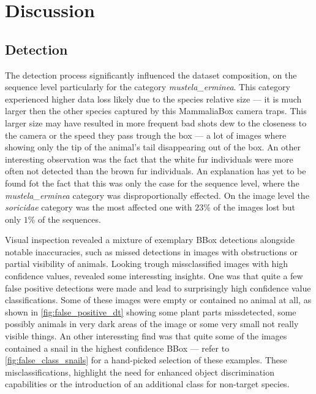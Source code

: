 


\section{Discussion}
\label{discussion}

\subsection{Detection}

The detection process significantly influenced the dataset composition, on the sequence level particularly for the category \textit{mustela\_erminea}.
This category experienced higher data loss likely due to the species relative size --- it is much larger then the other species captured by this MammaliaBox camera traps.
This larger size may have resulted in more frequent bad shots dew to the closeness to the camera or the speed they pass trough the box --- a lot of images where showing only the tip of the animal's tail disappearing out of the box.
An other interesting observation was the fact that the white fur individuals were more often not detected than the brown fur individuals.
An explanation has yet to be found fot the fact that this was only the case for the sequence level, where the \textit{mustela\_erminea} category was disproportionally effected.
On the image level the \textit{soricidae} category was the most affected one with \(23\%\) of the images lost but only \(1\%\) of the sequences.

Visual inspection revealed a mixture of exemplary BBox detections alongside notable inaccuracies, such as missed detections in images with obstructions or partial visibility of animals.
Looking trough missclassified images with high confidence values, revealed some interessting insights.
One was that quite a few false positive detections were made and lead to surprisingly high confidence value classifications.
Some of these images were empty or contained no animal at all, as shown in \autoref{fig:false_positive_dt} showing some plant parts missdetected, some possibly animals in very dark areas of the image or some very small not really visible things.
An other interessting find was that quite some of the images contained a snail in the highest confidence BBox --- refer to \autoref{fig:false_class_snails} for a hand-picked selection of these examples.
These misclassifications, highlight the need for enhanced object discrimination capabilities or the introduction of an additional class for non-target species.

